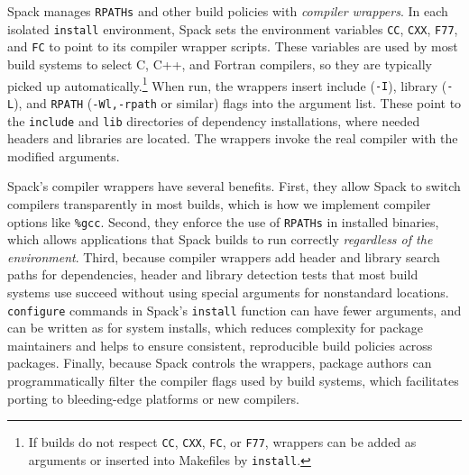 Spack manages {\tt RPATHs} and other build policies with
{\it compiler wrappers}.
In each isolated {\tt install} environment, Spack sets the environment variables
{\tt CC}, {\tt CXX}, {\tt F77}, and {\tt FC} to point to its compiler
wrapper scripts.  These variables are used by most build systems to select
C, C++, and Fortran compilers, so they are typically picked up
automatically.\footnote{If builds do not respect {\tt CC}, {\tt CXX}, {\tt FC},
or {\tt F77},
wrappers can be added as arguments or inserted into Makefiles
by {\tt install}.}
When run, the wrappers insert include ({\tt -I}), library ({\tt -L}), and
{\tt RPATH} ({\tt -Wl,-rpath} or similar) flags into the argument list.
These point to the {\tt include} and {\tt lib} directories of dependency
installations, where needed headers and libraries are located.
The wrappers invoke the real compiler with the modified arguments.

Spack's compiler wrappers have several benefits.  First, they allow
Spack to switch compilers transparently in most builds, which is how we
implement compiler options like {\tt \%gcc}.  Second, they enforce the
use of {\tt RPATHs} in installed binaries, which allows applications that 
Spack builds to run correctly {\it regardless of the environment}.  Third, 
because compiler wrappers add header and library search paths for dependencies,
header and library detection tests that most build systems use succeed without
using special arguments for nonstandard locations.  {\tt configure}
commands in Spack's {\tt install} function can have fewer arguments, and can
be written as for system installs, which reduces complexity
for package maintainers and helps to ensure consistent, reproducible
build policies across packages.  Finally, because Spack controls the
wrappers, package authors can programmatically filter the compiler flags
used by build systems, which facilitates porting to bleeding-edge platforms 
or new compilers.

